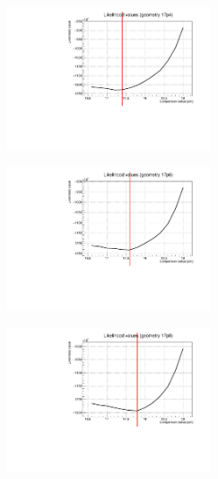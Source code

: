 \documentclass[a4paper, 11pt, twoside, openright]{report}
\begin{document}
\begin{figure}[htbp]
\begin{minipage}[b]{.32\textwidth}
\includegraphics[width=6cm, height=4.6cm]{figs/likelihood100HighStat/likelihood17p4.pdf}
\end{minipage}\hfill
\begin{minipage}[b]{.32\textwidth}
\includegraphics[width=6cm, height=4.6cm]{figs/likelihood100HighStat/likelihood17p6.pdf}
\end{minipage} \hfill
\begin{minipage}[b]{.32\textwidth}
\includegraphics[width=6cm, height=4.6cm]{figs/likelihood100HighStat/likelihood17p8.pdf}
\end{minipage} \hfill \vspace{10pt}


\end{figure}
\end{document}
